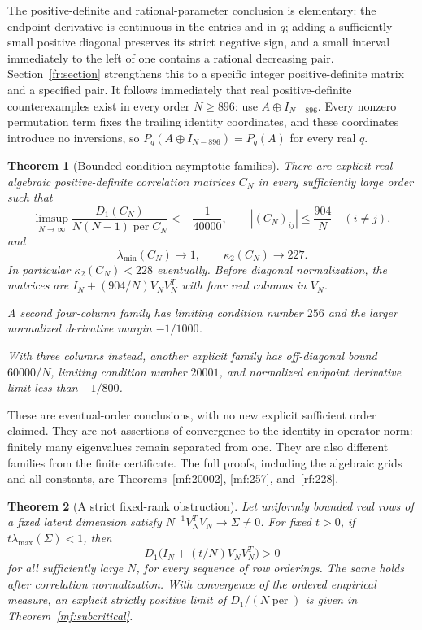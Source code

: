 \documentclass[11pt]{article}
\newtheorem{theorem}{Theorem}[section]
\theoremstyle{remark}\newtheorem{remark}[theorem]{Remark}
\newcommand{\per}{\operatorname{per}}
\begin{document}
The positive-definite and rational-parameter conclusion is elementary:
the endpoint derivative is continuous in the entries and in $q$; adding
a sufficiently small positive diagonal preserves its strict negative
sign, and a small interval immediately to the left of one contains a
rational decreasing pair. Section~\ref{fr:section} strengthens this to a
specific integer positive-definite matrix and a specified pair.
It follows immediately that real positive-definite counterexamples
exist in every order $N\ge896$: use $A\oplus I_{N-896}$.
Every nonzero permutation term fixes the trailing identity coordinates,
and these coordinates introduce no inversions, so
$P_q(A\oplus I_{N-896})=P_q(A)$ for every real $q$.

\begin{theorem}[Bounded-condition asymptotic families]\label{thm:families}
There are explicit real algebraic positive-definite correlation matrices
$C_N$ in every sufficiently large order such that
\[
 \limsup_{N\to\infty}\frac{D_1(C_N)}{N(N-1)\per C_N}<-\frac1{40000},
 \qquad |(C_N)_{ij}|\le\frac{904}{N}\quad(i\ne j),
\]
and
\[
 \lambda_{\min}(C_N)\longrightarrow1,\qquad
 \kappa_2(C_N)\longrightarrow227.
\]
In particular $\kappa_2(C_N)<228$ eventually. Before diagonal
normalization, the matrices are $I_N+(904/N)V_NV_N^T$ with four real
columns in $V_N$.

A second four-column family has limiting condition number $256$ and
the larger normalized derivative margin $-1/1000$.

With three columns instead, another explicit family has off-diagonal
bound $60000/N$, limiting condition number $20001$, and normalized
endpoint derivative limit less than $-1/800$.
\end{theorem}

These are eventual-order conclusions, with no new explicit sufficient
order claimed. They are not assertions of convergence to the identity
in operator norm: finitely many eigenvalues remain separated from one.
They are also different families from the finite certificate.
The full proofs, including the algebraic grids and all constants, are
Theorems~\ref{mf:20002}, \ref{mf:257}, and~\ref{rf:228}.

\begin{theorem}[A strict fixed-rank obstruction]\label{thm:obstruction-intro}
Let uniformly bounded real rows of a fixed latent dimension satisfy
$N^{-1}V_N^TV_N\to\Sigma\ne0$. For fixed $t>0$, if
$t\lambda_{\max}(\Sigma)<1$, then
\[
 D_1\bigl(I_N+(t/N)V_NV_N^T\bigr)>0
\]
for all sufficiently large $N$, for every sequence of row orderings.
The same holds after correlation normalization. With convergence of the
ordered empirical measure, an explicit strictly positive limit of
$D_1/(N\per)$ is given in Theorem~\ref{mf:subcritical}.
\end{theorem}
\end{document}
